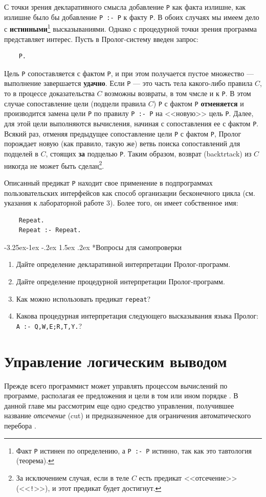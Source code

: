 \documentclass[12pt, openany, twoside]{book} %
\makeatletter
\renewcommand\subsubsection{\@startsection{subsubsection}{3}{\z@}%
                                     {-3.25ex\@plus -1ex \@minus -.2ex}%
                                     {1.5ex \@plus .2ex}%
                                     {\normalfont\normalsize\bfseries}}
\newenvironment{questions}{\subsubsection*{Вопросы для самопроверки}\begin{enumerate}}{\end{enumerate}}
\makeatother
\begin{document}
\noindent С точки зрения декларативного смысла добавление {\tt P} как факта излишне, как излишне было бы добавление {\tt P~:-~P} к факту {\tt P}. В обоих случаях мы имеем дело с {\bf истинными}\footnote{Факт {\tt P} истинен по определению, а {\tt P~:-~P} истинно, так как это тавтология (теорема).} высказываниями. Однако с процедурной точки зрения программа представляет интерес. Пусть в Пролог-систему введен запрос:
{\tt\begin{verbatim}
    P.
\end{verbatim}}
\noindent Цель {\tt P} сопоставляется с фактом {\tt P}, и при этом получается пустое множество --- выполнение завершается {\bf удачно}. Если {\tt P} --- это часть тела какого-либо правила $C$, то в процессе доказательства $C$ возможны возвраты, в том чмсле и к {\tt P}. В этом случае сопоставление цели (подцели правила $C$) {\tt P} с фактом {\tt P} {\bf отменяется} и производится замена цели {\tt P} по правилу {\tt P~:-~P} на <<новую>> цель {\tt P}. Далее, для этой цели выполняются вычисления, начиная с сопоставления ее с фактом {\tt P}. Всякий раз, отменяя предыдущее сопоставление цели {\tt P} с фактом {\tt P}, Пролог порождает новую (как правило, такую же) ветвь поиска сопоставлений для подцелей в $C$, стоящих {\bf за} подцелью {\tt P}. Таким образом, возврат (backtrtack) из $C$ никогда не может быть сделан\footnote{За исключением случая, если в теле $C$ есть предикат <<отсечение>> (<<{\tt !}>>), и этот предикат будет достигнут.}.

Описанный предикат {\tt P} находит свое применение в подпрограммах пользовательских интерфейсов как способ организации бесконечного цикла (см. указания к лабораторной работе 3). Более того, он имеет собственное имя:
{\tt\begin{verbatim}
    Repeat.
    Repeat :- Repeat.
\end{verbatim}}

\begin{questions}
  \item{} Дайте определение декларативной интерпретации Пролог-про\-грамм.
  \item{} Дайте определение процедурной интерпретации Пролог-про\-грамм.
  \item{} Как можно использовать предикат \texttt{repeat}?
  \item{} Какова процедурная интерпретация следующего высказывания языка Пролог: \texttt{A :- Q,W,E;R,T,Y.}?
\end{questions}


\chapter{Управление логическим выводом}
Прежде всего программист может управлять процессом вычислений по программе, располагая ее предложения и цели в том или ином порядке \cite{Bratko}. В данной главе мы рассмотрим еще одно средство управления, получившее название {\em отсечение} (cut) и предназначенное для ограничения автоматического перебора \cite{Bratko}.
\end{document}
